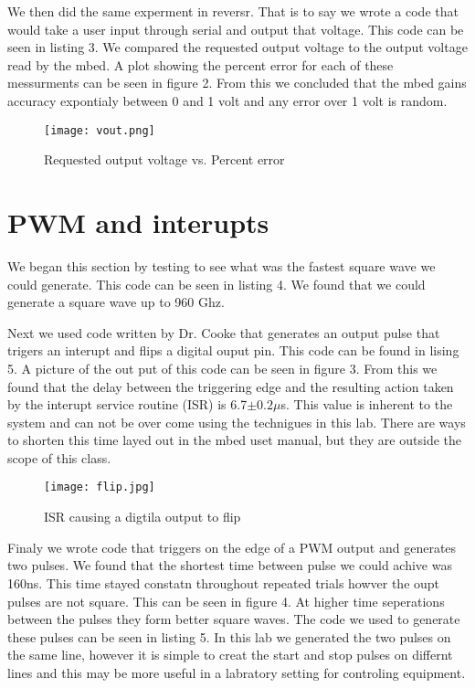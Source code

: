 \documentclass[prl,12pt,notitlepage,aps,onecolumn,superscriptaddress]{revtex4-1}
\begin{document}
We then did the same experment in reversr. That is to say we wrote a code that would take a user input through serial and output that voltage. This code can be seen in listing 3. We compared the requested output voltage to the output voltage read by the mbed. A plot showing the percent error for each of these messurments can be seen in figure 2. From this we concluded that the mbed gains accuracy expontialy between 0 and 1 volt and any error over 1 volt is random. 

\begin{figure}[h]
\begin{center}
\texttt{[image: vout.png]}
\end{center}
\caption{\label{fig:pic} Requested output voltage vs. Percent error}
\end{figure}

\section{PWM and interupts}
We began this section by testing to see what was the fastest square wave we could generate. This code can be seen in listing 4. We found that we could generate a square wave up to 960 Ghz.

Next we used code written by Dr. Cooke that generates an output pulse that trigers an interupt and flips a digital ouput pin. This code can be found in lising 5. A picture of the out put of this code can be seen in figure 3. From this we found that the delay between the triggering edge and the resulting action taken by the interupt service routine (ISR) is 6.7$\pm0.2\mu$s. This value is inherent to the system and can not be over come using the technigues in this lab. There are ways to shorten this time layed out in the mbed uset manual, but they are outside the scope of this class. 

\begin{figure}[h]
\begin{center}
\texttt{[image: flip.jpg]}
\end{center}
\caption{\label{fig:pic} ISR causing a digtila output to flip}
\end{figure}

Finaly we wrote code that triggers on the edge of a PWM output and generates two pulses. We found that the shortest time between pulse we could achive was 160ns. This time stayed constatn throughout repeated trials howver the oupt pulses are not square. This can be seen in figure 4. At higher time seperations between the pulses they form better square waves. The code we used to generate these pulses can be seen in listing 5. In this lab we generated the two pulses on the same line, however it is simple to creat the start and stop pulses on differnt lines and this may be more useful in a labratory setting for controling equipment.
\end{document}
